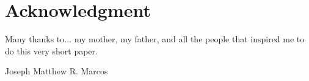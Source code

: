 \documentclass[journal]{./IEEE/IEEEtran}
\newcommand{\ADVISEE}{Joseph Matthew R. Marcos}
\begin{document}
\section*{Acknowledgment}
Many thanks to... my mother, my father, and all the people that inspired me to do this very short paper.

\begin{biography}{\ADVISEE}
\end{biography}


\newpage
% 


\end{document}
